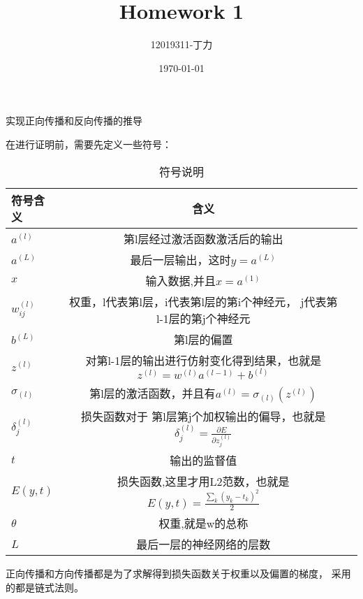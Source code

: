 \documentclass{homework}
\author{12019311-丁力}
\date{\today}
\title{ Homework 1}
\begin{document}
 \maketitle

\question 实现正向传播和反向传播的推导


在进行证明前，需要先定义一些符号：
\begin{table}[htbp]
	\centering 
	\caption{\label{tab:test}符号说明}
	\begin{tabular}{lcr}
		\toprule
		符号含义 & 含义  \\
		\midrule
		$a^{(l)}$ & 第l层经过激活函数激活后的输出 \\

		$a^{(L)}$ & 最后一层输出，这时$y=a^{(L)}$ \\
		$x$ & 输入数据,并且$x=a^{(1)}$ \\
		$w_{ij}^{(l)}$ & 权重，l代表第l层，i代表第l层的第i个神经元，
		j代表第l-1层的第j个神经元 \\
		$b^{(L)}$ & 第l层的偏置 \\
		$z^{(l)}$ & 对第l-1层的输出进行仿射变化得到结果，也就是
		$z^{(l)} =w^{(l)}a^{(l-1)} +b^{(l)} $\\
		$\sigma_{(l)}$ & 第l层的激活函数，并且有$a^{(l)} = 
		\sigma_{(l)}(z^{(l)})$\\
		$\delta^{(l)}_j$ & 损失函数对于
		第l层第j个加权输出的偏导，也就是$\delta^{(l)}_j= 
		\frac{\partial E}{\partial z^{(l)}_j}$\\
		$t$ & 输出的监督值 \\
		$E(y,t)$ & 损失函数,这里才用L2范数，也就是$E(y,t) = 
		\frac{\sum_k(y_k-t_k)^2}{2}$ \\
		$\theta$ & 权重,就是w的总称 \\
		$L$ & 最后一层的神经网络的层数 \\
		\bottomrule
	\end{tabular}
\end{table}

正向传播和方向传播都是为了求解得到损失函数关于权重以及偏置的梯度，
采用的都是链式法则。
\iffalse
\noindent Rather than finding the shortest path between two points, suppose our car is low on gas, so we want to take the path that uses the least fuel. In the real world, navigation optimized for fuel consumption may take more steps to reach a destination \footnote{\href{https://blog.google/products/maps/3-new-ways-navigate-more-sustainably-maps/}{Google Maps Blog}}. 

Consider the same MDP, but with two new ``efficient actions'' -- move right or move down. For example, starting from state 3, you can either move to state 4 or 9. Once again, the actions are deterministic and always succeed unless you run into a wall. Attempting to move in the direction of a wall from a gray square using an efficient action results in you moving \textit{down} one square. For clarity, we will use separate symbols $r_s$ for the reward associated with an inefficient action (right $\&$ up, or  right $\&$ down) and $r_e$ for the reward associated with an efficient action.
\fi 
\end{document}
